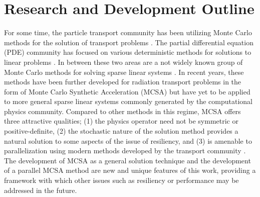 \section{Research and Development Outline}
\label{sec:research_outline}
For some time, the particle transport community has been utilizing
Monte Carlo methods for the solution of transport problems
\cite{lewis_computational_1993}. The partial differential equation
(PDE) community has focused on various deterministic methods for
solutions to linear problems \cite{saad_iterative_2003,
  kelley_iterative_1995}. In between these two areas are a not widely
known group of Monte Carlo methods for solving sparse linear systems
\cite{forsythe_matrix_1950, hammersley_monte_1964,
  halton_sequential_1962, halton_sequential_1994}. In recent years,
these methods have been further developed for radiation transport
problems in the form of Monte Carlo Synthetic Acceleration (MCSA)
\cite{evans_monte_2009, evans_monte_2012} but have yet to be applied
to more general sparse linear systems commonly generated by the
computational physics community. Compared to other methods in this
regime, MCSA offers three attractive qualities; (1) the physics
operator need not be symmetric or positive-definite, (2) the
stochastic nature of the solution method provides a natural solution
to some aspects of the issue of resiliency, and (3) is amenable to
parallelization using modern methods developed by the transport
community \cite{wagner_hybrid_2010}. The development of MCSA as a
general solution technique and the development of a parallel MCSA
method are new and unique features of this work, providing a framework
with which other issues such as resiliency or performance may be
addressed in the future.

